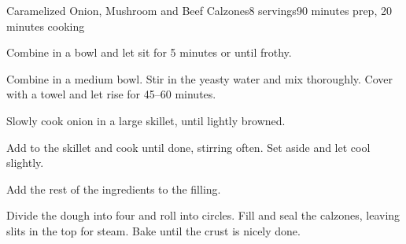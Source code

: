 \documentclass[../Cookbook.tex]{subfiles}
\begin{document}
\begin{recipe}{Caramelized Onion, Mushroom and Beef Calzones}{8 servings}{90 minutes prep, 20 minutes cooking}

Combine in a bowl and let sit for 5 minutes or until frothy.

Combine in a medium bowl. Stir in the yeasty water and mix thoroughly. Cover with a towel and let rise for 45--60 minutes.

Slowly cook onion in a large skillet, until lightly browned.

Add to the skillet and cook until done, stirring often. Set aside and let cool slightly.

Add the rest of the ingredients to the filling.

\newstep
{}
Divide the dough into four and roll into circles. Fill and seal the calzones, leaving slits in the top for steam. Bake until the crust is nicely done.

\end{recipe}
\end{document}
